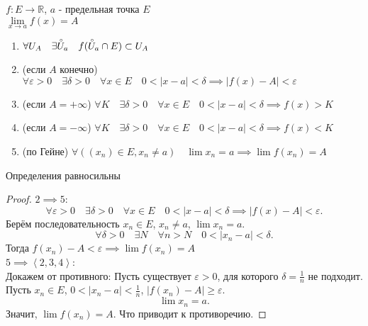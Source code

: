\documentclass[11pt, oneside]{article}   	%
\begin{document}
        \begin{definition}
            $f: E \to \mathbb{R}$, $a$ - предельная точка $E$\\
            $\lim\limits_{x \to a} f(x) = A$\\
            \begin{enumerate}
                \item $\forall{U_A}\quad \exists{\accentset{\circ}{U}_a}\quad f(\accentset{\circ}{U}_a\cap E) \subset U_A$
                \item (если $A$ конечно) $\forall{\varepsilon > 0}\quad \exists{\delta > 0}\quad \forall{x\in E}\quad 0 < |x-a| < \delta \implies |f(x) - A| < \varepsilon$
                \item (если $A=+\infty$) $\forall{K}\quad \exists{\delta>0}\quad \forall{x\in E}\quad 0<|x-a|<\delta \implies f(x) > K$
                \item (если $A=-\infty$) $\forall{K}\quad \exists{\delta>0}\quad \forall{x\in E}\quad 0<|x-a|<\delta \implies f(x) < K$
                \item (по Гейне) $\forall{((x_n)\in E, x_n \neq a)}\quad \lim x_n = a \implies \lim f(x_n) = A$
            \end{enumerate}
        \end{definition}
        \begin{theorem}
            Определения равносильны
            \begin{proof}
                $2 \implies 5$:\\
                \[ \forall{\varepsilon>0}\quad \exists{\delta>0}\quad \forall{x\in E}\quad 0<|x-a|<\delta \implies |f(x)-A|<\varepsilon .\] 
                Берём последовательность $x_n\in E$, $x_n \neq  a$, $\lim x_n = a$.\\
                \[ \forall{\delta > 0}\quad \exists{N}\quad \forall{n>N}\quad 0 < |x_n-a|<\delta .\]
                Тогда $f(x_n)-A<\varepsilon \implies \lim f(x_n) = A$\\
                 $5 \implies \left<2, 3, 4\right>$:\\
                Докажем от противного:
                Пусть существует $\varepsilon>0$, для которого $\delta=\frac{1}{n}$ не подходит.\\
                Пусть $x_n\in E$, $0<|x_n-a|<\frac{1}{n}$, $|f(x_n)-A|\ge \varepsilon$.\\
                \[ \lim x_n = a .\]
                Значит, $\lim f(x_n) = A$. Что приводит к противоречию.
            \end{proof}
        \end{theorem}
\end{document}
